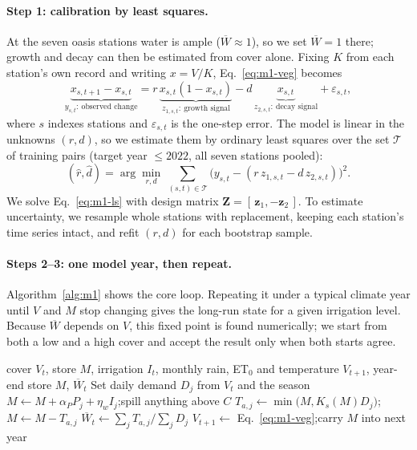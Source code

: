\paragraph{Step 1: calibration by least squares.} At the seven oasis stations water is ample ($\overline W\approx1$), so we set $\overline W=1$ there; growth and decay can then be estimated from cover alone. Fixing $K$ from each station's own record and writing $x=V/K$, Eq.~\eqref{eq:m1-veg} becomes
\begin{equation}\label{eq:m1-reg}
\underbrace{x_{s,t+1}-x_{s,t}}_{y_{s,t}:\ \text{observed change}}=r\,\underbrace{x_{s,t}(1-x_{s,t})}_{z_{1,s,t}:\ \text{growth signal}}-d\,\underbrace{x_{s,t}}_{z_{2,s,t}:\ \text{decay signal}}+\varepsilon_{s,t},
\end{equation}
where $s$ indexes stations and $\varepsilon_{s,t}$ is the one-step error. The model is linear in the unknowns $(r,d)$, so we estimate them by ordinary least squares over the set $\mathcal T$ of training pairs (target year $\le2022$, all seven stations pooled):
\begin{equation}\label{eq:m1-ls}
(\hat r,\hat d)=\arg\min_{r,d}\ \sum_{(s,t)\in\mathcal T}\big(y_{s,t}-(r\,z_{1,s,t}-d\,z_{2,s,t})\big)^2 .
\end{equation}
We solve Eq.~\eqref{eq:m1-ls} with design matrix $\bm Z=[\,\bm z_1,-\bm z_2\,]$. To estimate uncertainty, we resample whole stations with replacement, keeping each station's time series intact, and refit $(r,d)$ for each bootstrap sample.

\paragraph{Steps 2--3: one model year, then repeat.} Algorithm~\ref{alg:m1} shows the core loop. Repeating it under a typical climate year until $V$ and $M$ stop changing gives the long-run state for a given irrigation level. Because $\overline W$ depends on $V$, this fixed point is found numerically; we start from both a low and a high cover and accept the result only when both starts agree.

\begin{algorithm}[H]
\caption{One model year: the water store drives cover}\label{alg:m1}
\begin{algorithmic}[1]
\Require cover $V_t$, store $M$, irrigation $I_t$, monthly rain, ET$_0$ and temperature
\Ensure $V_{t+1}$, year-end store $M$, $\overline W_t$
\State Set daily demand $D_j$ from $V_t$ and the season 
  \State $M\gets M+\alpha_PP_j+\eta_wI_j$;\quad spill anything above $C$ 
  \State $T_{a,j}\gets\min\big(M,K_s(M)D_j\big)$;\quad $M\gets M-T_{a,j}$ 
\EndFor
\State $\overline W_t\gets\sum_jT_{a,j}/\sum_jD_j$ 
\State $V_{t+1}\gets$ Eq.~\eqref{eq:m1-veg};\quad carry $M$ into next year
\end{algorithmic}
\end{algorithm}

